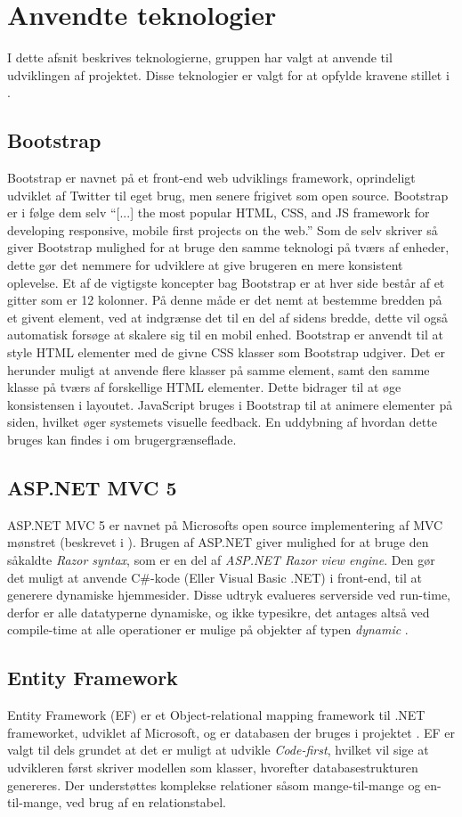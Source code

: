 \section{Anvendte teknologier}
I dette afsnit beskrives teknologierne, gruppen har valgt at anvende til udviklingen af projektet.
Disse teknologier er valgt for at opfylde kravene stillet i .

\subsection{Bootstrap}
Bootstrap er navnet på et front-end web udviklings framework, oprindeligt udviklet af Twitter til eget brug, men senere frigivet som open source.
Bootstrap er i følge dem selv ``[...] the most popular HTML, CSS, and JS framework for developing responsive, mobile first projects on the web.'' \cite{GETBOOTSTRAP}
Som de selv skriver så giver Bootstrap mulighed for at bruge den samme teknologi på tværs af enheder, dette gør det nemmere for udviklere at give brugeren en mere konsistent oplevelse.
Et af de vigtigste koncepter bag Bootstrap er at hver side består af et gitter som er 12 kolonner.
På denne måde er det nemt at bestemme bredden på et givent element, ved at indgrænse det til en del af sidens bredde, dette vil også automatisk forsøge at skalere sig til en mobil enhed.
Bootstrap er anvendt til at style HTML elementer med de givne CSS klasser som Bootstrap udgiver.
Det er herunder muligt at anvende flere klasser på samme element, samt den samme klasse på tværs af forskellige HTML elementer.
Dette bidrager til at øge konsistensen i layoutet.
JavaScript bruges i Bootstrap til at animere elementer på siden, hvilket øger systemets visuelle feedback.
En uddybning af hvordan dette bruges kan findes i  om brugergrænseflade. \cite{GETBOOTSTRAP}

\subsection{ASP.NET MVC 5}\label{aspnet}
ASP.NET MVC 5 er navnet på Microsofts open source implementering af MVC mønstret (beskrevet i ).
Brugen af ASP.NET giver mulighed for at bruge den såkaldte \textit{Razor syntax}, som er en del af \textit{ASP.NET Razor view engine}.
Den gør det muligt at anvende C\#-kode (Eller Visual Basic .NET) i front-end, til at generere dynamiske hjemmesider.
Disse udtryk evalueres serverside ved run-time, derfor er alle datatyperne dynamiske, og ikke typesikre, det antages altså ved compile-time at alle operationer er mulige på objekter af typen \textit{dynamic} \citep{UsingTypeDynamic}.


\subsection{Entity Framework}
Entity Framework (EF) er et Object-relational mapping framework til .NET frameworket, udviklet af Microsoft, og er databasen der bruges i projektet \citep{EF}.
EF er valgt til dels grundet at det er muligt at udvikle \textit{Code-first}, hvilket vil sige at udvikleren først skriver modellen som klasser, hvorefter databasestrukturen genereres.
Der understøttes komplekse relationer såsom mange-til-mange og en-til-mange, ved brug af en relationstabel.
